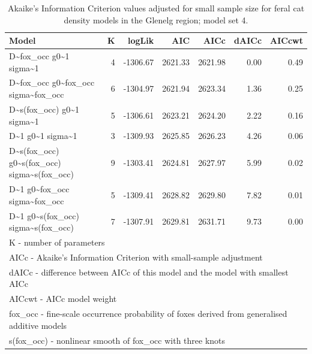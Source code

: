\documentclass[preprint, 3p, authoryear]{elsarticle} %
\begin{document}
\begin{longtable}[t]{lrrrrrr}
\caption{\label{tab:density-aic-g-3}Akaike's Information Criterion values adjusted for small sample size for feral cat density models in the Glenelg region; model set 4.}\\
\toprule
Model & K & logLik & AIC & AICc & dAICc & AICcwt\\
\midrule
D\textasciitilde{}fox\_occ g0\textasciitilde{}1 sigma\textasciitilde{}1 & 4 & -1306.67 & 2621.33 & 2621.98 & 0.00 & 0.49\\
D\textasciitilde{}fox\_occ g0\textasciitilde{}fox\_occ sigma\textasciitilde{}fox\_occ & 6 & -1304.97 & 2621.94 & 2623.34 & 1.36 & 0.25\\
D\textasciitilde{}s(fox\_occ) g0\textasciitilde{}1 sigma\textasciitilde{}1 & 5 & -1306.61 & 2623.21 & 2624.20 & 2.22 & 0.16\\
D\textasciitilde{}1 g0\textasciitilde{}1 sigma\textasciitilde{}1 & 3 & -1309.93 & 2625.85 & 2626.23 & 4.26 & 0.06\\
D\textasciitilde{}s(fox\_occ) g0\textasciitilde{}s(fox\_occ) sigma\textasciitilde{}s(fox\_occ) & 9 & -1303.41 & 2624.81 & 2627.97 & 5.99 & 0.02\\
\addlinespace
D\textasciitilde{}1 g0\textasciitilde{}fox\_occ sigma\textasciitilde{}fox\_occ & 5 & -1309.41 & 2628.82 & 2629.80 & 7.82 & 0.01\\
D\textasciitilde{}1 g0\textasciitilde{}s(fox\_occ) sigma\textasciitilde{}s(fox\_occ) & 7 & -1307.91 & 2629.81 & 2631.71 & 9.73 & 0.00\\
\bottomrule
\multicolumn{7}{l}{\rule{0pt}{1em}K - number of parameters}\\
\multicolumn{7}{l}{\rule{0pt}{1em}AICc - Akaike's Information Criterion with small-sample adjustment}\\
\multicolumn{7}{l}{\rule{0pt}{1em}dAICc - difference between AICc of this model and the model with smallest AICc}\\
\multicolumn{7}{l}{\rule{0pt}{1em}AICcwt - AICc model weight}\\
\multicolumn{7}{l}{\rule{0pt}{1em}fox\_occ - fine-scale occurrence probability of foxes derived from generalised additive models}\\
\multicolumn{7}{l}{\rule{0pt}{1em}s(fox\_occ) - nonlinear smooth of fox\_occ with three knots}\\
\end{longtable}
\endgroup{}

\newpage

\begingroup\fontsize{10}{12}\selectfont
\end{document}
